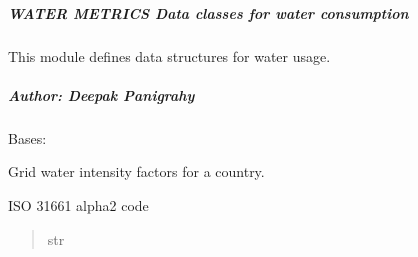 \documentclass[letterpaper,10pt,english]{sphinxmanual}
\begin{document}
\subparagraph{WATER METRICS \textendash{} Data classes for water consumption}
\label{\detokenize{core.sustainability.models.water_metrics:water-metrics-data-classes-for-water-consumption}}
\sphinxAtStartPar
This module defines data structures for water usage.


\subparagraph{Author: Deepak Panigrahy}
\label{\detokenize{core.sustainability.models.water_metrics:author-deepak-panigrahy}}

\begin{fulllineitems}
\label{\detokenize{core.sustainability.models.water_metrics:core.sustainability.models.water_metrics.WaterIntensityFactors}}
\pysigstartsignatures
\pysiglinewithargsret
{}
{\sphinxparamcomma {}\sphinxparamcomma {}\sphinxparamcomma {}\sphinxparamcomma {}\sphinxparamcomma {}}
{}
\pysigstopsignatures
\sphinxAtStartPar
Bases: 

\sphinxAtStartPar
Grid water intensity factors for a country.

\begin{fulllineitems}
\label{\detokenize{core.sustainability.models.water_metrics:core.sustainability.models.water_metrics.WaterIntensityFactors.country_code}}
\pysigstartsignatures
\pysigline
{}
\pysigstopsignatures
\sphinxAtStartPar
ISO 3166\sphinxhyphen{}1 alpha\sphinxhyphen{}2 code
\begin{quote}\begin{description}
\sphinxAtStartPar
str


\end{description}
\end{quote}
\end{fulllineitems}
\end{fulllineitems}
\end{document}

